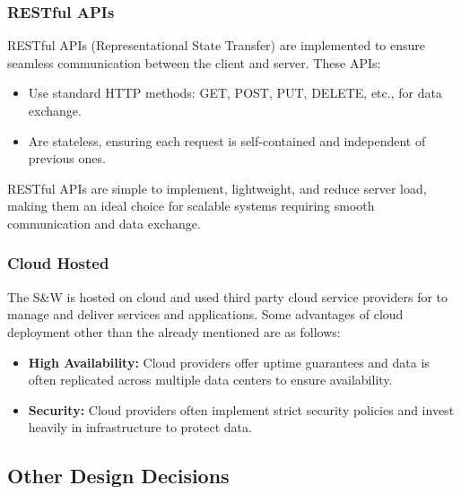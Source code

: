 \subsubsection{RESTful APIs}
RESTful APIs (Representational State Transfer) are implemented to ensure seamless communication between the client and server. These APIs:
\begin{itemize}
    \item Use standard HTTP methods: GET, POST, PUT, DELETE, etc., for data exchange.
    \item Are stateless, ensuring each request is self-contained and independent of previous ones.
\end{itemize}
RESTful APIs are simple to implement, lightweight, and reduce server load, making them an ideal choice for scalable systems requiring smooth communication and data exchange.

\subsubsection{Cloud Hosted}
The S\&W is hosted on cloud and used third party cloud service providers for to manage and deliver services and applications. Some advantages of cloud deployment other than the already mentioned are as follows:
\begin{itemize}
    \item \textbf{High Availability:} Cloud providers offer uptime guarantees and data is often replicated across multiple data centers to ensure availability.
    \item \textbf{Security:} Cloud providers often implement strict security policies and invest heavily in infrastructure to protect data.
\end{itemize}



\subsection{Other Design Decisions}

